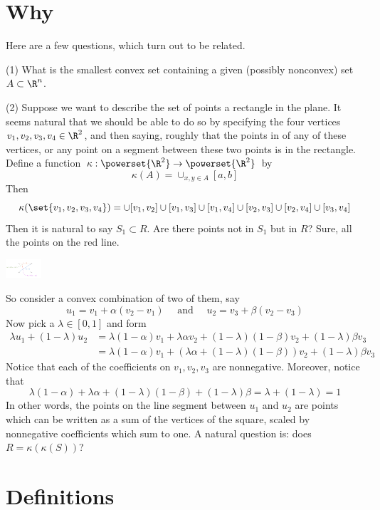 
\section*{Why}

Here are a few questions, which turn out to be related.

(1) What is the smallest convex set containing a given (possibly nonconvex) set $A \subset \R ^n$.

(2) Suppose we want to describe the set of points a rectangle in the plane.
It seems natural that we should be able to do so by specifying the four vertices $v_1, v_2, v_3, v_4 \in \R ^2$, and then saying, roughly that the points in of any of these vertices, or any point on a segment between these two points is in the rectangle.
Define a function $\kappa : \powerset{\R ^2} \to \powerset{\R ^2}$ by
\[
\kappa (A) = \cup_{x, y \in A} [a, b]
\]
Then
\[
\kappa (\set{v_1, v_2, v_3, v_4}) =
\cup [v_1, v_2] \cup [v_1, v_3] \cup [v_1, v_4]
\cup [v_2, v_3] \cup [v_2, v_4]
\cup [v_3, v_4]
\]
Then it is natural to say $S_1 \subset R$.
Are there points not in $S_1$ but in $R$?
Sure, all the points on the red line.
\begin{center}  \includegraphics[width=0.100\textwidth]{./graphics/convexhullrect.pdf}\end{center}
So consider a convex combination of two of them, say
\[
u_1 = v_1 + \alpha (v_2 - v_1) \quad \text{ and } \quad u_2 = v_3 + \beta (v_2 - v_3)
\]
Now pick a $\lambda  \in [0,1]$ and form
\[
\begin{aligned}
\lambda u_1 + (1-\lambda )u_2
&= \lambda (1-\alpha )v_1 + \lambda \alpha v_2 + (1-\lambda )(1-\beta )v_2 + (1-\lambda )\beta v_3 \\
&= \lambda (1-\alpha )v_1 + (\lambda \alpha  + (1-\lambda )(1-\beta ))v_2 + (1-\lambda )\beta v_3
\end{aligned}
\]
Notice that each of the coefficients on $v_1, v_2, v_3$ are nonnegative.
Moreover, notice that
\[
\lambda (1-\alpha ) + \lambda \alpha  + (1-\lambda )(1-\beta ) + (1-\lambda )\beta  = \lambda  + (1-\lambda ) = 1
\]
In other words, the points on the line segment between $u_1$ and $u_2$ are points which can be written as a sum of the vertices of the square, scaled by nonnegative coefficients which sum to one.
A natural question is: does $R = \kappa (\kappa (S))$?

\section*{Definitions}

